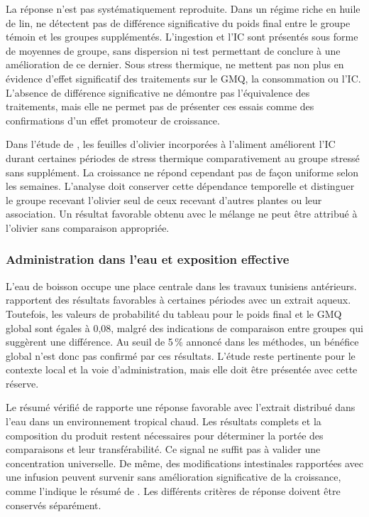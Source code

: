La réponse n'est pas systématiquement reproduite. Dans un régime riche en huile de lin, \citet{Pirman2021} ne détectent pas de différence significative du poids final entre le groupe témoin et les groupes supplémentés. L'ingestion et l'IC sont présentés sous forme de moyennes de groupe, sans dispersion ni test permettant de conclure à une amélioration de ce dernier. Sous stress thermique, \citet{Agah2019} ne mettent pas non plus en évidence d'effet significatif des traitements sur le GMQ, la consommation ou l'IC. L'absence de différence significative ne démontre pas l'équivalence des traitements, mais elle ne permet pas de présenter ces essais comme des confirmations d'un effet promoteur de croissance.

Dans l'étude de \citet{Mahasneh2024}, les feuilles d'olivier incorporées à l'aliment améliorent l'IC durant certaines périodes de stress thermique comparativement au groupe stressé sans supplément. La croissance ne répond cependant pas de façon uniforme selon les semaines. L'analyse doit conserver cette dépendance temporelle et distinguer le groupe recevant l'olivier seul de ceux recevant d'autres plantes ou leur association. Un résultat favorable obtenu avec le mélange ne peut être attribué à l'olivier sans comparaison appropriée.

\subsubsection{Administration dans l'eau et exposition effective}

L'eau de boisson occupe une place centrale dans les travaux tunisiens antérieurs. \citet{Jabri2017} rapportent des résultats favorables à certaines périodes avec un extrait aqueux. Toutefois, les valeurs de probabilité du tableau pour le poids final et le GMQ global sont égales à 0,08, malgré des indications de comparaison entre groupes qui suggèrent une différence. Au seuil de 5\,\% annoncé dans les méthodes, un bénéfice global n'est donc pas confirmé par ces résultats. L'étude reste pertinente pour le contexte local et la voie d'administration, mais elle doit être présentée avec cette réserve.

Le résumé vérifié de \citet{Oke2017} rapporte une réponse favorable avec l'extrait distribué dans l'eau dans un environnement tropical chaud. Les résultats complets et la composition du produit restent nécessaires pour déterminer la portée des comparaisons et leur transférabilité. Ce signal ne suffit pas à valider une concentration universelle. De même, des modifications intestinales rapportées avec une infusion peuvent survenir sans amélioration significative de la croissance, comme l'indique le résumé de \citet{Erener2023}. Les différents critères de réponse doivent être conservés séparément.

